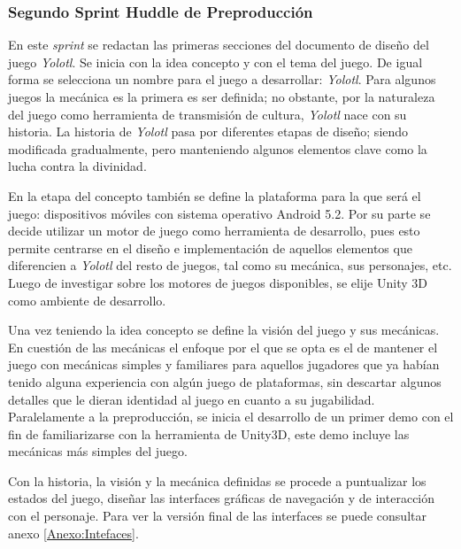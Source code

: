 \subsubsection{Segundo Sprint Huddle de Preproducción}\label{PrePro02}
En este \textit{sprint} se redactan las primeras secciones del documento de diseño del 
juego \textit{Yolotl}. Se inicia con la idea concepto y con el tema del juego. De igual 
forma se selecciona un nombre para el juego a desarrollar: \textit{Yolotl}. 
Para algunos juegos la mecánica es la primera es ser definida; no obstante, 
por la naturaleza del juego como herramienta de transmisión de cultura, 
\textit{Yolotl} nace con su historia. La historia de \textit{Yolotl} pasa por 
diferentes etapas de diseño; siendo modificada gradualmente, pero manteniendo 
algunos elementos clave como la lucha contra la divinidad. 
\\
\par
En la etapa del concepto también se define la plataforma para la que será 
el juego: dispositivos móviles con sistema operativo Android 5.2. Por su parte 
se decide utilizar un motor de juego como herramienta de desarrollo, pues esto 
permite centrarse en el diseño e implementación de aquellos elementos que 
diferencien a \textit{Yolotl} del resto de juegos, tal como su mecánica, sus 
personajes, etc. Luego de investigar sobre los motores de juegos disponibles, 
se elije Unity 3D como ambiente de desarrollo.
\\
\par
Una vez teniendo la idea concepto se define la visión del juego y sus mecánicas. 
En cuestión de las mecánicas el enfoque por el que se opta es el de mantener 
el juego con mecánicas simples y familiares para aquellos jugadores que ya habían 
tenido alguna experiencia con algún juego de plataformas, sin descartar algunos 
detalles que le dieran identidad al juego en cuanto a su jugabilidad. Paralelamente 
a la preproducción, se inicia el desarrollo de un primer demo con el fin de 
familiarizarse con la herramienta de Unity3D, este demo incluye las mecánicas más 
simples del juego.
\\
\par
Con la historia, la visión y la mecánica definidas se procede a puntualizar los 
estados del juego, diseñar las interfaces gráficas de navegación y de interacción 
con el personaje. Para ver la versión final de las interfaces se puede consultar 
anexo \ref{Anexo:Intefaces}.

